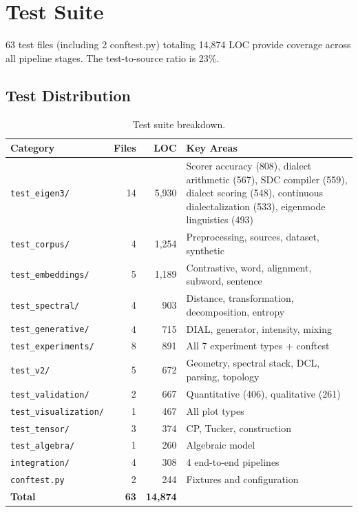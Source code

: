 \documentclass[11pt,a4paper]{article}
\begin{document}
\section{Test Suite}

63 test files (including 2 conftest.py) totaling 14{,}874 LOC provide coverage
across all pipeline stages. The test-to-source ratio is 23\%.

\subsection{Test Distribution}

\begin{table}[H]
\centering
\caption{Test suite breakdown.}
\begin{tabular}{@{}lrrp{5.5cm}@{}}
\toprule
\textbf{Category} & \textbf{Files} & \textbf{LOC} & \textbf{Key Areas} \\
\midrule
\texttt{test\_eigen3/} & 14 & 5{,}930 & Scorer accuracy (808), dialect arithmetic (567), SDC compiler (559), dialect scoring (548), continuous dialectalization (533), eigenmode linguistics (493) \\
\texttt{test\_corpus/} & 4 & 1{,}254 & Preprocessing, sources, dataset, synthetic \\
\texttt{test\_embeddings/} & 5 & 1{,}189 & Contrastive, word, alignment, subword, sentence \\
\texttt{test\_spectral/} & 4 & 903 & Distance, transformation, decomposition, entropy \\
\texttt{test\_generative/} & 4 & 715 & DIAL, generator, intensity, mixing \\
\texttt{test\_experiments/} & 8 & 891 & All 7 experiment types + conftest \\
\texttt{test\_v2/} & 5 & 672 & Geometry, spectral stack, DCL, parsing, topology \\
\texttt{test\_validation/} & 2 & 667 & Quantitative (406), qualitative (261) \\
\texttt{test\_visualization/} & 1 & 467 & All plot types \\
\texttt{test\_tensor/} & 3 & 374 & CP, Tucker, construction \\
\texttt{test\_algebra/} & 1 & 260 & Algebraic model \\
\texttt{integration/} & 4 & 308 & 4 end-to-end pipelines \\
\texttt{conftest.py} & 2 & 244 & Fixtures and configuration \\
\midrule
\textbf{Total} & \textbf{63} & \textbf{14{,}874} & \\
\bottomrule
\end{tabular}
\end{table}
\end{document}

